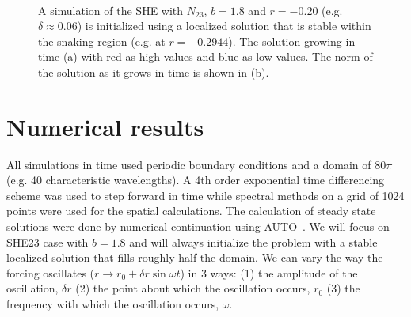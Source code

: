 \documentclass[pre,preprint,superscriptaddress]{revtex4-1}
\begin{document}
\begin{figure}[h]
  \begin{center}
    \mbox{
       \quad
      }
    \caption{A simulation of the SHE with $N_{23}$, $b=1.8$ and $r=-0.20$ (e.g. $\delta\approx 0.06$) is initialized using a localized solution that is stable within the snaking region (e.g. at $r=-0.2944$). The solution growing in time (a) with red as high values and blue as low values.  The norm of the solution as it grows in time is shown in (b).}
    \label{fig:nucleation}
  \end{center}
\end{figure} 

\section{Numerical results}

All simulations in time used periodic boundary conditions and a domain of $80\pi$ (e.g. 40 characteristic wavelengths).  A 4th order exponential time differencing scheme\cite{cox2002} was used to step forward  in time while spectral methods on a grid of 1024 points were used for the spatial calculations.  The  calculation of steady state solutions were done by numerical continuation using AUTO~\cite{doedel1981auto}.   We will focus on SHE23 case with $b=1.8$ and will always initialize the problem with a stable localized solution that fills roughly half the domain.  We can vary the way the forcing oscillates ($r\rightarrow r_0+\delta r \sin\omega t$) in 3 ways: (1) the amplitude of the oscillation, $\delta r$ (2) the point about which the oscillation occurs, $r_0$ (3) the frequency with which the oscillation occurs, $\omega$.
\end{document}
